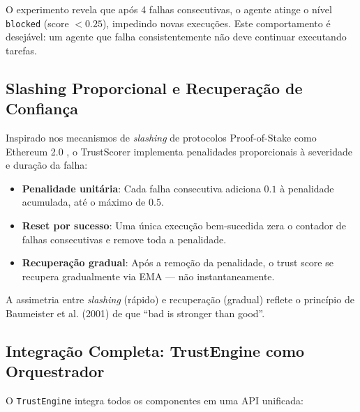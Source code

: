 O experimento revela que após 4 falhas consecutivas, o agente atinge o nível \texttt{blocked} (score $< 0.25$), impedindo novas execuções. Este comportamento é desejável: um agente que falha consistentemente não deve continuar executando tarefas.

\subsection{Slashing Proporcional e Recuperação de Confiança}

Inspirado nos mecanismos de \textit{slashing} de protocolos Proof-of-Stake como Ethereum 2.0 \cite{Buterin2020_Eth2}, o TrustScorer implementa penalidades proporcionais à severidade e duração da falha:

\begin{itemize}
    \item \textbf{Penalidade unitária}: Cada falha consecutiva adiciona $0.1$ à penalidade acumulada, até o máximo de $0.5$.
    \item \textbf{Reset por sucesso}: Uma única execução bem-sucedida zera o contador de falhas consecutivas e remove toda a penalidade.
    \item \textbf{Recuperação gradual}: Após a remoção da penalidade, o trust score se recupera gradualmente via EMA — não instantaneamente.
\end{itemize}

A assimetria entre \textit{slashing} (rápido) e recuperação (gradual) reflete o princípio de Baumeister et al. (2001) \cite{Baumeister2001_BadStronger} de que ``bad is stronger than good''.

\subsection{Integração Completa: TrustEngine como Orquestrador}

O \texttt{TrustEngine} integra todos os componentes em uma API unificada:

